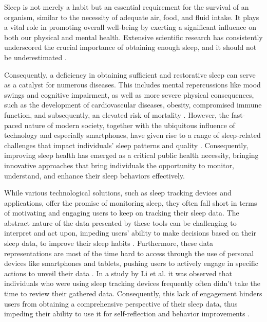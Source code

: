 \documentclass[
  a4paper,  %
  twoside,  %
  bibliography=totoc,
  headsepline,
  cleardoublepage=empty,
  parskip=half,
  draft=false
]{scrbook}
\begin{document}
Sleep is not merely a habit but an essential requirement for the survival of an organism, similar to the necessity of adequate air, food, and fluid intake. It plays a vital role in promoting overall well-being by exerting a significant influence on both our physical and mental health. Extensive scientific research has consistently underscored the crucial importance of obtaining enough sleep, and it should not be underestimated \cite{Define_Sleep_Health}.

 Consequently, a deficiency in obtaining sufficient and restorative sleep can serve as a catalyst for numerous diseases. This includes mental repercussions like mood swings and cognitive impairment, as well as more severe physical consequences, such as the development of cardiovascular diseases, obesity, compromised immune function, and subsequently, an elevated risk of mortality \cite{Mortality_short_sleep, consequences_sleep_deprivation}. However, the fast-paced nature of modern society, together with the ubiquitous influence of technology and especially smartphones, have given rise to a range of sleep-related challenges that impact individuals’ sleep patterns and quality \cite{problematic_smartphone_use}. Consequently, improving sleep health has emerged as a critical public health necessity, bringing innovative approaches that bring individuals the opportunity to monitor, understand, and enhance their sleep behaviors effectively.

While various technological solutions, such as sleep tracking devices and applications, offer the promise of monitoring sleep, they often fall short in terms of motivating and engaging users to keep on tracking their sleep data. The abstract nature of the data presented by these tools can be challenging to interpret and act upon, impeding users' ability to make decisions based on their sleep data, to improve their sleep habits \cite{Sleep_essential_to_health}.
Furthermore, these data representations are most of the time hard to access through the use of personal devices like smartphones and tablets, pushing users to actively engage in specific actions to unveil their data \cite{Ambient_visualization}. In a study by  Li et al. \cite{Stage_Based_Model} it was observed that individuals who were using sleep tracking devices frequently often didn't take the time to review their gathered data. Consequently, this lack of engagement hinders users from obtaining a comprehensive perspective of their sleep data, thus impeding their ability to use it for self-reflection and behavior improvements \cite{Stage_Based_Model}. 
\end{document}

